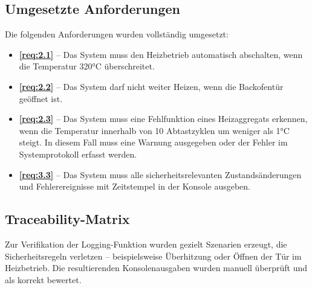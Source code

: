 \documentclass[a4paper,12pt]{article}
\begin{document}
\subsection{Umgesetzte Anforderungen}

Die folgenden Anforderungen wurden vollständig umgesetzt:

\begin{itemize}
    \item \textbf{\ref{req:2.1}} – Das System muss den Heizbetrieb automatisch abschalten, wenn die Temperatur 320°C überschreitet.
    \item \textbf{\ref{req:2.2}} – Das System darf nicht weiter Heizen, wenn die Backofentür geöffnet ist.
    \item \textbf{\ref{req:2.3}} – Das System muss eine Fehlfunktion eines Heizaggregats erkennen, wenn die Temperatur innerhalb von 10 Abtastzyklen um weniger als 1°C steigt. In diesem Fall muss eine Warnung ausgegeben oder der Fehler im Systemprotokoll erfasst werden.
    \item \textbf{\ref{req:3.3}} – Das System muss alle sicherheitsrelevanten Zustandsänderungen und Fehlerereignisse mit Zeitstempel in der Konsole ausgeben.
\end{itemize}

\subsection{Traceability-Matrix}


\vspace{1em}
Zur Verifikation der Logging-Funktion wurden gezielt Szenarien erzeugt, die Sicherheitsregeln verletzen – beispielsweise Überhitzung oder Öffnen der Tür im Heizbetrieb. Die resultierenden Konsolenausgaben wurden manuell überprüft und als korrekt bewertet.
\end{document}
